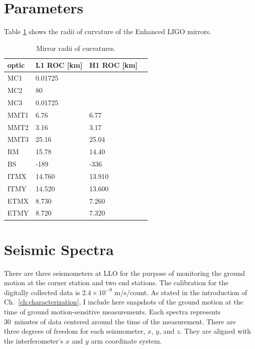 



\section{Parameters}
Table \ref{tab:ROCs} shows the radii of curvature of the Enhanced LIGO mirrors. 
\begin{table}
\centering
\caption{Mirror radii of curvatures.} 
\begin{tabular}{l l l l}
\hline
optic & L1 ROC [km] & H1 ROC [km] \\
\hline
MC1 & 0.01725 & \\
MC2 & 80 & \\ 
MC3 & 0.01725 & \\ 
MMT1 & 6.76 & 6.77 \\
MMT2 & 3.16 & 3.17 \\
MMT3 & 25.16 & 25.04\\
RM & 15.78 & 14.40 \\
BS & -189 & -336 \\
ITMX & 14.760 & 13.910 \\ 
ITMY & 14.520 & 13.600 \\
ETMX & 8.730 & 7.260 \\
ETMY & 8.720 & 7.320 \\
\hline
\end{tabular}
\label{tab:ROCs}
\end{table} 




\section{Seismic Spectra}
\label{sec:groundmotion}
There are three seismometers at LLO for the purpose of monitoring the
ground motion at the corner station and two end stations. The
calibration for the digitally collected data is $2.4 \times 10^{-9}$
m/s/count. As stated in the introduction of
Ch.~\ref{ch:characterization}, I include here snapshots of the ground
motion at the time of ground motion-sensitive measurements. Each
spectra represents 30~minutes of data centered around the time of the
measurement. There are three degrees of freedom for each seismometer,
$x$, $y$, and $z$. They are aligned with the interferometer's $x$ and
$y$ arm coordinate system.

